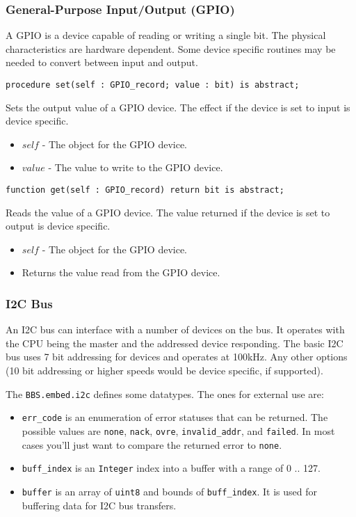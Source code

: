 \documentclass[10pt, openany]{book}
\newcommand{\package}[1]{\texttt{#1}}
\newcommand{\datatype}[1]{\texttt{#1}}
\begin{document}
\subsubsection{General-Purpose Input/Output (GPIO)}
A GPIO is a device capable of reading or writing a single bit.  The physical characteristics are hardware dependent.  Some device specific routines may be needed to convert between input and output.
\begin{lstlisting}
procedure set(self : GPIO_record; value : bit) is abstract;
\end{lstlisting}
Sets the output value of a GPIO device.  The effect if the device is set to input is device specific.
\begin{itemize}
  \item $self$ - The object for the GPIO device.
  \item $value$ - The value to write to the GPIO device.
\end{itemize}
\begin{lstlisting}
function get(self : GPIO_record) return bit is abstract;
\end{lstlisting}
Reads the value of a GPIO device.  The value returned if the device is set to output is device specific.
\begin{itemize}
  \item $self$ - The object for the GPIO device.
  \item Returns the value read from the GPIO device.
\end{itemize}

\subsubsection{I2C Bus}
An I2C bus can interface with a number of devices on the bus.  It operates with the CPU being the master and the addressed device responding.  The basic I2C bus uses 7 bit addressing for devices and operates at 100kHz.  Any other options (10 bit addressing or higher speeds would be device specific, if supported).

The \package{BBS.embed.i2c} defines some datatypes.  The ones for external use are:
\begin{itemize}
  \item \datatype{err\_code} is an enumeration of error statuses that can be returned.  The possible values are \datatype{none}, \datatype{nack}, \datatype{ovre}, \datatype{invalid\_addr}, and \datatype{failed}.  In most cases you'll just want to compare the returned error to \datatype{none}.
  \item \datatype{buff\_index} is an \datatype{Integer} index into a buffer with a range of 0 .. 127.
  \item \datatype{buffer} is an array of \datatype{uint8} and bounds of \datatype{buff\_index}.  It is used for buffering data for I2C bus transfers.
\end{itemize}
\end{document}
